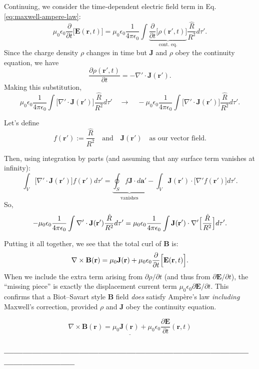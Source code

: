 \documentclass[a4paper,12pt]{article} %
\begin{document}
Continuing, we consider the time‐dependent electric field term in Eq. \eqref{eq:maxwell-ampere-law}:
\begin{equation}
  \mu_0 \epsilon_0 \frac{\partial}{\partial t}\Big[\mathbf{E}(\mathbf{r},t)\Big]= \mu_0 \epsilon_0 \frac{1}{4\pi\epsilon_0}\int
  \underbrace{\frac{\partial}{\partial t}\Big[\rho(\mathbf{r}',t)\Big]}_{\text{cont. eq.}}
  \frac{\hat{R}}{R^2}d\tau'.
\label{eq:displacement-current-term}
\end{equation}
Since the charge density $\rho$ changes in time but $\mathbf{J}$ and $\rho$ obey the continuity equation, we have
$$
  \frac{\partial \rho(\mathbf{r}',t)}{\partial t}=
  -\nabla' \cdot \mathbf{J}(\mathbf{r}').
$$
Making this substitution,
$$
  \mu_0 \epsilon_0 \frac{1}{4\pi\epsilon_0}
  \int 
  \bigl[\nabla' \cdot \mathbf{J}(\mathbf{r}')\bigr]
  \frac{\hat{R}}{R^2}d\tau'
  \quad\longrightarrow\quad
  -\mu_0 \epsilon_0 \frac{1}{4\pi\epsilon_0}
  \int 
  \bigl[\nabla' \cdot \mathbf{J}(\mathbf{r}')\bigr]
  \frac{\hat{R}}{R^2}d\tau'.
$$

Let's define
$$
  f(\mathbf{r}') := \frac{\hat{R}}{R^2}
  \quad\text{and}\quad
  \mathbf{J}(\mathbf{r}')
  \quad\text{as our vector field.}
$$

Then, using integration by parts (and assuming that any surface term vanishes at infinity):
$$
  \int_{V} \bigl[\nabla' \cdot \mathbf{J}(\mathbf{r}')\bigr]
  f(\mathbf{r}')d\tau'=\underbrace{\oint_{S} f \mathbf{J}\cdot d\mathbf{a}'}_{\text{vanishes}} -\int_{V} \mathbf{J}(\mathbf{r}') \cdot \bigl[\nabla' f(\mathbf{r}')\bigr] d\tau'.
$$
So, 
$$
  -\mu_0 \epsilon_0 \frac{1}{4\pi\epsilon_0}
  \int \nabla' \cdot \mathbf{J}(\mathbf{r}') \frac{\hat{R}}{R^2}
  d\tau'=\mu_0 \epsilon_0 \frac{1}{4\pi\epsilon_0} \int \mathbf{J}(\mathbf{r}') \cdot \nabla' \Bigl[\frac{\hat{R}}{R^2}\Big] d\tau'.
$$

Putting it all together, we see that the total curl of $\mathbf{B}$ is:
$$
  \nabla \times \mathbf{B}(\mathbf{r})=\mu_0\mathbf{J}(\mathbf{r})+\mu_0\epsilon_0\frac{\partial}{\partial t}\Bigl[\mathbf{E}(\mathbf{r},t)\Bigr].
$$
When we include the extra term arising from 
$\partial\rho/\partial t$ (and thus from $\partial\mathbf{E}/\partial t$), the “missing piece” is exactly the displacement current term $\mu_0\epsilon_0\partial\mathbf{E}/\partial t$.  This confirms that a Biot–Savart style $\mathbf{B}$ field \emph{does} satisfy Ampère’s law \emph{including} 
Maxwell’s correction, provided $\rho$ and $\mathbf{J}$ obey the continuity equation.

$$
\underline{\boxed{
   \nabla \times \mathbf{B}(\mathbf{r})=
   \mu_0\mathbf{J}(\mathbf{r})+
   \mu_0\epsilon_0\frac{\partial \mathbf{E}}{\partial t}(\mathbf{r},t)}}
$$

\subsubsection*{-----------------------------------------------------------------------------------------------------}
\end{document}

